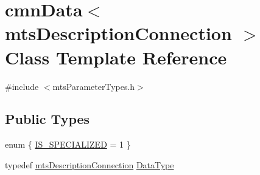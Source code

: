 \hypertarget{classcmn_data_3_01mts_description_connection_01_4}{}\section{cmn\+Data$<$ mts\+Description\+Connection $>$ Class Template Reference}
\label{classcmn_data_3_01mts_description_connection_01_4}


{\ttfamily \#include $<$mts\+Parameter\+Types.\+h$>$}

\subsection*{Public Types}
\begin{DoxyCompactItemize}
\item 
enum \{ \hyperlink{classcmn_data_3_01mts_description_connection_01_4_aaa0116aa4e31f4127587d4fae40433a5a7b0c948b9ee14c84663770cf2547cbe6}{I\+S\+\_\+\+S\+P\+E\+C\+I\+A\+L\+I\+Z\+E\+D} = 1
 \}
\item 
typedef \hyperlink{classmts_description_connection}{mts\+Description\+Connection} \hyperlink{classcmn_data_3_01mts_description_connection_01_4_ab5515cf136f07ae656b44ade675282a9}{Data\+Type}
\end{DoxyCompactItemize}
